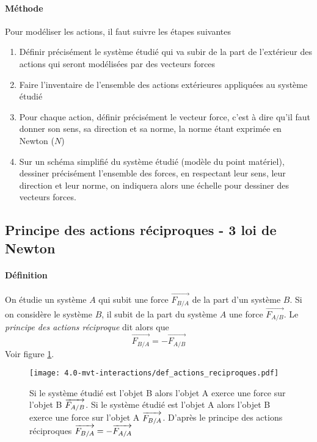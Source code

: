 \paragraph{Méthode} 
Pour modéliser les actions, il faut suivre les étapes suivantes
\begin{enumerate}
 \item Définir précisément le système étudié qui va subir de la part de l'extérieur des actions qui seront modélisées par des vecteurs forces
 \item Faire l'inventaire de l'ensemble des actions extérieures appliquées au système étudié
 \item Pour chaque action, définir précisément le vecteur force, c'est à dire qu'il faut donner son sens, sa direction et sa norme, la norme étant exprimée en Newton ($N$)
 \item Sur un schéma simplifié du système étudié (modèle du point matériel), dessiner précisément l'ensemble des forces, en respectant leur sens, leur direction et leur norme, on indiquera alors une échelle pour dessiner des vecteurs forces.
\end{enumerate}


\subsection{Principe des actions réciproques - 3\ieme{} loi de Newton}
\paragraph{Définition} On étudie un système $A$ qui subit une force $\overrightarrow{F_{B/A}}$
de la part d'un système $B$. Si on considère le système $B$, il subit de la part du système $A$ une
force $\overrightarrow{F_{A/B}}$. Le \textit{principe des actions réciproque} dit alors que 
$$\overrightarrow{F_{B/A}} =  -\overrightarrow{F_{A/B}} $$
  Voir figure \ref{fig:def_actions_reciproques}.

\begin{figure}[h!]
  \begin{center}
      \texttt{[image: 4.0-mvt-interactions/def\_actions\_reciproques.pdf]}
  \end{center}
  \caption{Si le système étudié est l'objet B alors l'objet A exerce une force sur l'objet B $\protect\overrightarrow{F_{A/B}}$. Si le système étudié est l'objet A alors l'objet B exerce une force sur l'objet A  $\protect\overrightarrow{F_{B/A}}$. D'après le principe des actions réciproques $\protect\overrightarrow{F_{B/A}}= - \protect\overrightarrow{F_{A/A}}$  }
  \label{fig:def_actions_reciproques}
\end{figure}



